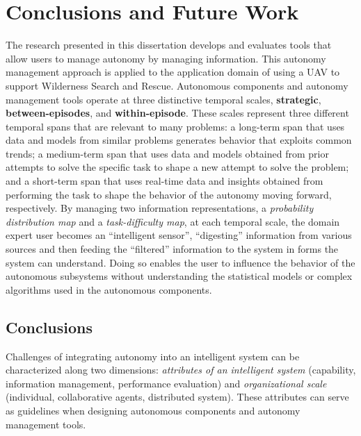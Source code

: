 \chapter[Conclusions and Future Work]{Conclusions and Future Work}
\label{chap:Conclusions}

The research presented in this dissertation develops and evaluates tools that allow users to manage autonomy by managing information. This autonomy management approach is applied to the application domain of using a UAV to support Wilderness Search and Rescue. Autonomous components and autonomy management tools operate at three distinctive temporal scales, \textbf{strategic}, \textbf{between-episodes}, and \textbf{within-episode}. These scales represent three different temporal spans that are relevant to many problems: a long-term span that uses data and models from similar problems generates behavior that exploits common trends; a medium-term span that uses data and models obtained from prior attempts to solve the specific task to shape a new attempt to solve the problem; and a short-term span that uses real-time data and insights obtained from performing the task to shape the behavior of the autonomy moving forward, respectively. By managing two information representations, a \textit{probability distribution map} and a \textit{task-difficulty map}, at each temporal scale, the domain expert user becomes an ``intelligent sensor'', ``digesting'' information from various sources and then feeding the ``filtered'' information to the system in forms the system can understand. Doing so enables the user to influence the behavior of the autonomous subsystems without understanding the statistical models or complex algorithms used in the autonomous components.

\section{Conclusions}
\label{conclusions}

Challenges of integrating autonomy into an intelligent system can be characterized along two dimensions: \textit{attributes of an intelligent system} (capability, information management, performance evaluation) and \textit{organizational scale} (individual, collaborative agents, distributed system). These attributes can serve as guidelines when designing autonomous components and autonomy management tools. 

